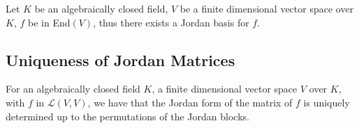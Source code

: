 Let $K$ be an algebraically closed field, $V$ be a finite dimensional 
vector space over $K$, $f$ be in End$(V)$, thus there exists a Jordan
basis for $f$. 

\subsection{Uniqueness of Jordan Matrices}

For an algebraically closed field $K$, a finite dimensional vector space $V$ over
$K$, with $f$ in $\mathcal{L}(V, V)$, we have that the Jordan form of the 
matrix of $f$ is uniquely determined up to the permutations of the Jordan blocks.
